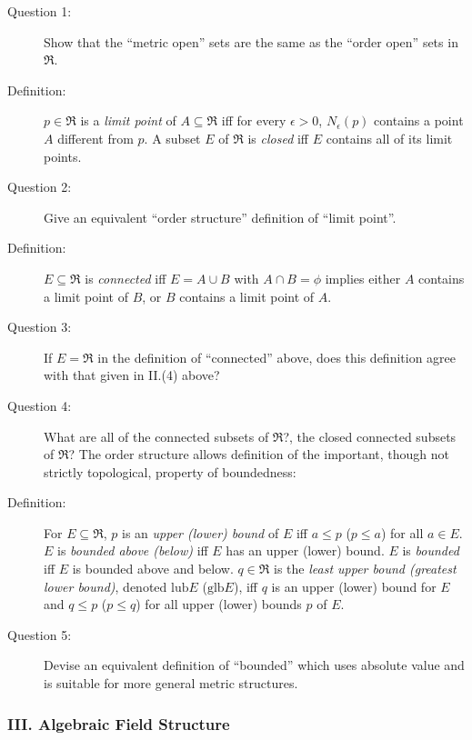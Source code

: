 \documentclass{article}
\begin{document}
\begin{description}

  \item[Question 1:] Show that the ``metric open'' sets are the same as the ``order open'' sets in $\Re$.

  \item[Definition:] $p \in \Re$ is a \emph{limit point} of $A \subseteq \Re$ iff for every $\epsilon > 0$, $N_\epsilon (p)$ contains a point $A$ different from $p$. A subset $E$ of $\Re$ is \emph{closed} iff $E$ contains all of its limit points.

  \item[Question 2:] Give an equivalent ``order structure'' definition of ``limit point''.

  \item[Definition:] $E \subseteq \Re$ is \emph{connected} iff $E = A \cup B$ with $A \cap B = \phi$ implies either $A$ contains a limit point of $B$, or $B$ contains a limit point of $A$.

  \item[Question 3:] If $E = \Re$ in the definition of ``connected'' above, does this definition agree with that given in II.(4) above?

  \item[Question 4:] What are all of the connected subsets of $\Re$?, the closed connected subsets of $\Re$? The order structure allows definition of the important, though not strictly topological, property of boundedness:

  \item[Definition:] For $E \subseteq \Re$, $p$ is an \emph{upper (lower) bound} of $E$ iff $a \leq p$ ($p \leq a$) for all $a \in E$. $E$ is \emph{bounded above (below)} iff $E$ has an upper (lower) bound. $E$ is \emph{bounded} iff $E$ is bounded above and below. $q \in \Re$ is the \emph{least upper bound (greatest lower bound)}, denoted $\text{lub} E$ ($\text{glb} E$), iff $q$ is an upper (lower) bound for $E$ and $q \leq p$ ($p \leq q$) for all upper (lower) bounds $p$ of $E$.

  \item[Question 5:] Devise an equivalent definition of ``bounded'' which uses absolute value and is suitable for more general metric structures.

\end{description}


\subsubsection*{III. Algebraic Field Structure}
\end{document}
